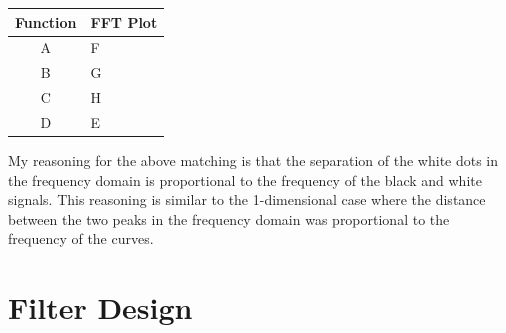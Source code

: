 \documentclass[12pt, oneside]{article}
\begin{document}
\begin{table}[H]
    \centering
    \begin{tabular}{|c|l|}
    \hline
    \multicolumn{1}{|l|}{\textbf{Function}} & \textbf{FFT Plot} \\ \hline
    A                                       & F                 \\ \hline
    B                                       & G                 \\ \hline
    C                                       & H                 \\ \hline
    D                                       & E                 \\ \hline
    \end{tabular}
\end{table}

My reasoning  for the above matching is that the separation of the white dots 
in the frequency domain is proportional to the frequency of the black and white
signals. This reasoning is similar to the 1-dimensional case where 
the distance between the two peaks in the frequency domain was 
proportional to the frequency of the curves.

\section{Filter Design}
\end{document}
